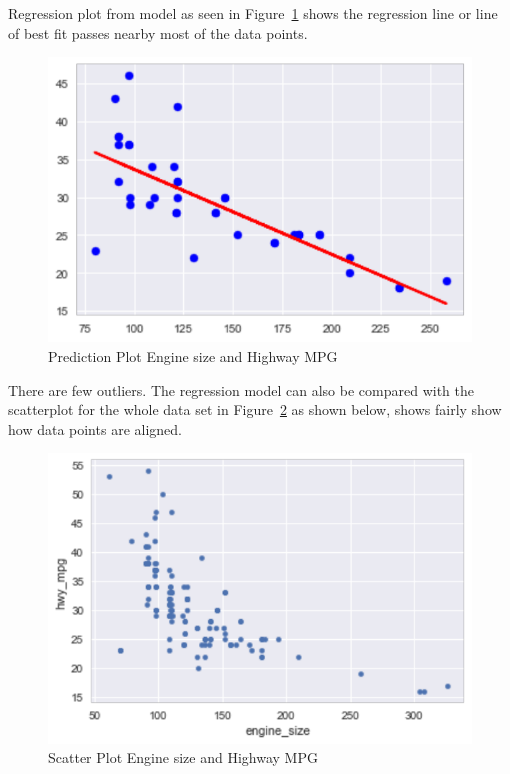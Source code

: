 
 Regression plot from model as seen in Figure~\ref{fig:predplt} shows 
 the regression line or line of best fit passes nearby most of the data
 points. 
 
 \begin{figure}[htb]
  \includegraphics[scale=1.0]{images/plot_pred_test_set.pdf}
  \caption{Prediction Plot Engine size and Highway MPG}
  \label{fig:predplt}
\end{figure}
 
 
 There are few outliers. The regression model can also be compared with 
 the scatterplot for the whole data set
 in Figure~\ref{fig:scatterplt} as shown below, shows fairly show how data 
 points are aligned.
 
  \begin{figure}[h!]
  \includegraphics[scale=1.0]{images/scatterplot.pdf}
  \caption{Scatter Plot Engine size and Highway MPG}
\label{fig:scatterplt}
\end{figure} 
 
